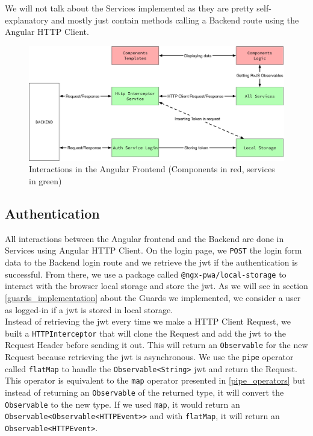 \documentclass[twoside, openright,11pt,a4paper]{book}
\newenvironment{code}{\captionsetup{type=listing}}{}
\begin{document}
We will not talk about the Services implemented as they are pretty self-explanatory and mostly just contain methods calling a Backend route using the Angular HTTP Client.
\begin{figure}[H]
\begin{center}
	\includegraphics[width=\textwidth]{assets/angular_implementation}
	\caption[Interactions in the Angular Frontend]{Interactions in the Angular Frontend (Components in red, services in green)}
	\label{interactions_angular}
\end{center}
\end{figure}
\subsection{Authentication}
All interactions between the Angular frontend and the Backend are done in Services using Angular HTTP Client. On the login page, we \verb+POST+ the login form data to the Backend login route and we retrieve the \gls{jwt} if the authentication is successful. From there, we use a package called \verb+@ngx-pwa/local-storage+\cite{github:angular:localstorage} to interact with the browser local storage and store the \gls{jwt}. As we will see in section \ref{guards_implementation} about the Guards we implemented, we consider a user as logged-in if a \gls{jwt} is stored in local storage.\\


Instead of retrieving the \gls{jwt} every time we make a HTTP Client Request, we built a \verb+HTTPInterceptor+\cite{angular:doc:httpinterceptor} that will clone the Request and add the \gls{jwt} to the Request Header before sending it out. This will return an \verb+Observable+ for the new Request because retrieving the \gls{jwt} is asynchronous.
We use the \verb+pipe+ operator called \verb+flatMap+ to handle the \verb+Observable<String>+ \gls{jwt} and return the Request. This operator is equivalent to the \verb+map+ operator presented in \ref{pipe_operators} but instead of returning an \verb+Observable+ of the returned type, it will convert the \verb+Observable+ to the new type.
If we used \verb+map+, it would return an \verb+Observable<Observable<HTTPEvent>>+ and with \verb+flatMap+, it will return an \verb+Observable<HTTPEvent>+.
\begin{code}
	\caption{The HTTP Interceptor Service that inserts the JWT in the Request}
\end{code}
\end{document}
